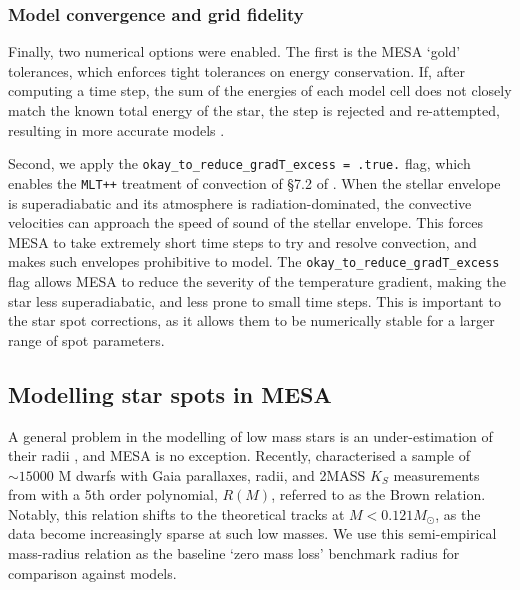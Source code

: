 \subsubsection{Model convergence and grid fidelity}

Finally, two numerical options were enabled.
The first is the MESA `gold' tolerances, which enforces tight tolerances on energy conservation.
If, after computing a time step, the sum of the energies of each model cell does not closely match the known total energy of the star, the step is rejected and re-attempted, resulting in more accurate models \citep{paxton2019}.

Second, we apply the \lstinline{okay_to_reduce_gradT_excess = .true.} flag, which enables the \lstinline{MLT++} treatment of convection of \S7.2 of \citet{paxton2013}.
When the stellar envelope is superadiabatic and its atmosphere is radiation-dominated, the convective velocities can approach the speed of sound of the stellar envelope. This forces MESA to take extremely short time steps to try and resolve convection, and makes such envelopes prohibitive to model. The \lstinline{okay_to_reduce_gradT_excess} flag allows MESA to reduce the severity of the temperature gradient, making the star less superadiabatic, and less prone to small time steps. This is important to the star spot corrections, as it allows them to be numerically stable for a larger range of spot parameters.


\subsection{Modelling star spots in MESA}
\label{sect:modelling:starspots in MESA}

A general problem in the modelling of low mass stars is an under-estimation of their radii \citep{lopez2005}, and MESA is no exception.
Recently, \citet{brown2022} characterised a sample of $\sim 15000$ M dwarfs with Gaia parallaxes, radii, and 2MASS $K_S$ measurements from \citet{morrell2019} with a 5th order polynomial, $R(M)$, referred to as the Brown relation. Notably, this relation shifts to the theoretical \citet{baraffe2015} tracks at $M < 0.121 M_\odot$, as the data become increasingly sparse at such low masses.
We use this semi-empirical mass-radius relation as the baseline `zero mass loss' benchmark radius for comparison against models.


